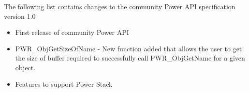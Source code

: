 The following list contains changes to the community Power API specification version 1.0

\begin{itemize}
  \item{First release of community Power API}
  \item{PWR_ObjGetSizeOfName - New function added that allows the user to get the size of buffer required to successfully call PWR_ObjGetName for a given object.}
  \item{Features to support Power Stack}
\end{itemize}



